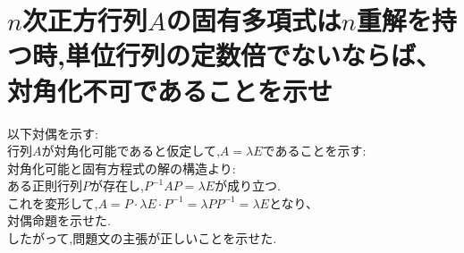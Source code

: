 \documentclass{jreport}
\begin{document}
\section{$n$次正方行列$A$の固有多項式は$n$重解を持つ時,単位行列の定数倍でないならば、対角化不可であることを示せ}
以下対偶を示す:\\
行列$A$が対角化可能であると仮定して,$A=\lambda E$であることを示す:\\
対角化可能と固有方程式の解の構造より:\\
ある正則行列$P$が存在し,$P^{-1}AP = \lambda E$が成り立つ.\\
これを変形して,$A=P\cdot \lambda E \cdot P^{-1} = \lambda PP^{-1} = \lambda E$となり、\\
対偶命題を示せた.\\
したがって,問題文の主張が正しいことを示せた.
\end{document}
